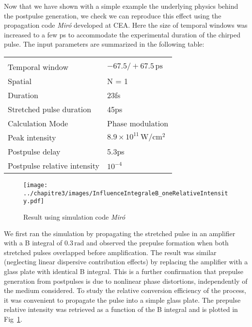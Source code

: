 \noindent  Now that we have shown with a simple example the underlying physics behind the postpulse generation, we check we can reproduce this effect using the propagation code \textit{Miró} developed at CEA. Here the size of temporal windows was increased to a few ps to accommodate the experimental duration of the chirped pulse. The input parameters are summarized in the following table:\\

\begin{center}
\begin{tabular}{p{5cm}p{5cm}}
\g{\textit{Miró} input} & \g{value} \\
Temporal window & $-67.5 / +67.5\,\mathrm{ps}$\\
Spatial & N = 1 \\
Duration & 23fs\\
Stretched pulse duration &  45ps \\
Calculation Mode & Phase modulation\\
Peak intensity & $8.9\times 10^{11}\,\mathrm{W/cm^2}$\\
Postpulse delay & 5.3ps\\
Postpulse relative intensity &  $10^{-4}$\\
\end{tabular}
\end{center}



\begin{figure}[H]
\centering
\texttt{[image: ../chapitre3/images/InfluenceIntegraleB\_oneRelativeIntensity.pdf]}\\
\caption{\label{fig:InfluenceIntegraleB_oneRelativeIntensity} Result using simulation code \textit{Miró}}
\end{figure}

\noindent  We first ran the simulation by propagating the stretched pulse in an amplifier with a B integral of $0.3\,\mathrm{rad}$ and observed the prepulse formation when both stretched pulses overlapped before amplification. The result was similar (neglecting linear dispersive contribution effects) by replacing the amplifier with a glass plate with identical B integral. This is a further confirmation that prepulse generation from postpulses is due to nonlinear phase distortions, independently of the medium considered. To study the relative conversion efficiency of the process, it was convenient to propagate the pulse into a simple glass plate.
The prepulse relative intensity was retrieved as a function of the B integral and is plotted in Fig~\ref{fig:InfluenceIntegraleB_oneRelativeIntensity}. 




